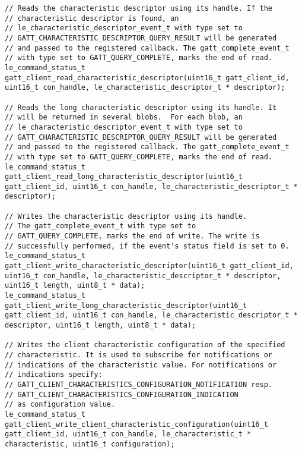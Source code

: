 \begin{lstlisting}
// Reads the characteristic descriptor using its handle. If the
// characteristic descriptor is found, an
// le_characteristic_descriptor_event_t with type set to
// GATT_CHARACTERISTIC_DESCRIPTOR_QUERY_RESULT will be generated
// and passed to the registered callback. The gatt_complete_event_t
// with type set to GATT_QUERY_COMPLETE, marks the end of read.
le_command_status_t gatt_client_read_characteristic_descriptor(uint16_t gatt_client_id, uint16_t con_handle, le_characteristic_descriptor_t * descriptor);

// Reads the long characteristic descriptor using its handle. It
// will be returned in several blobs.  For each blob, an
// le_characteristic_descriptor_event_t with type set to
// GATT_CHARACTERISTIC_DESCRIPTOR_QUERY_RESULT will be generated
// and passed to the registered callback. The gatt_complete_event_t
// with type set to GATT_QUERY_COMPLETE, marks the end of read.
le_command_status_t gatt_client_read_long_characteristic_descriptor(uint16_t gatt_client_id, uint16_t con_handle, le_characteristic_descriptor_t * descriptor);

// Writes the characteristic descriptor using its handle.
// The gatt_complete_event_t with type set to
// GATT_QUERY_COMPLETE, marks the end of write. The write is
// successfully performed, if the event's status field is set to 0.
le_command_status_t gatt_client_write_characteristic_descriptor(uint16_t gatt_client_id, uint16_t con_handle, le_characteristic_descriptor_t * descriptor, uint16_t length, uint8_t * data);
le_command_status_t gatt_client_write_long_characteristic_descriptor(uint16_t gatt_client_id, uint16_t con_handle, le_characteristic_descriptor_t * descriptor, uint16_t length, uint8_t * data);

// Writes the client characteristic configuration of the specified 
// characteristic. It is used to subscribe for notifications or 
// indications of the characteristic value. For notifications or 
// indications specify:
// GATT_CLIENT_CHARACTERISTICS_CONFIGURATION_NOTIFICATION resp. 
// GATT_CLIENT_CHARACTERISTICS_CONFIGURATION_INDICATION 
// as configuration value.
le_command_status_t gatt_client_write_client_characteristic_configuration(uint16_t gatt_client_id, uint16_t con_handle, le_characteristic_t * characteristic, uint16_t configuration);
\end{lstlisting}
\pagebreak